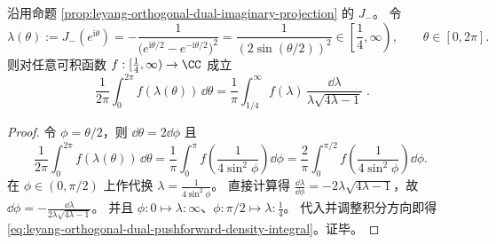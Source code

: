 \begin{theorem}\label{thm:leyang-orthogonal-dual-pushforward-density-formula}
沿用命题 \ref{prop:leyang-orthogonal-dual-imaginary-projection} 的 \(J_{-}\)。
令
\[
\lambda(\theta):=J_{-}(e^{\mathrm{i}\theta})
=-\frac{1}{\bigl(e^{\mathrm{i}\theta/2}-e^{-\mathrm{i}\theta/2}\bigr)^2}
=\frac{1}{(2\sin(\theta/2))^2}\in\left[\frac14,\infty\right),
\qquad \theta\in[0,2\pi].
\]
则对任意可积函数 \(f:[\tfrac14,\infty)\to\CC\) 成立
\begin{equation}\label{eq:leyang-orthogonal-dual-pushforward-density-integral}
\boxed{\;
\frac{1}{2\pi}\int_{0}^{2\pi} f(\lambda(\theta))\,\dd\theta
=
\frac{1}{\pi}\int_{1/4}^{\infty} f(\lambda)\,\frac{\dd\lambda}{\lambda\sqrt{4\lambda-1}}\; }.
\end{equation}
\end{theorem}
\begin{proof}
令 \(\phi=\theta/2\)，则 \(\dd\theta=2\dd\phi\) 且
\[
\frac{1}{2\pi}\int_{0}^{2\pi} f(\lambda(\theta))\,\dd\theta
=\frac{1}{\pi}\int_{0}^{\pi} f\!\left(\frac{1}{4\sin^2\phi}\right)\dd\phi
=\frac{2}{\pi}\int_{0}^{\pi/2} f\!\left(\frac{1}{4\sin^2\phi}\right)\dd\phi.
\]
在 \(\phi\in(0,\pi/2)\) 上作代换 \(\lambda=\frac{1}{4\sin^2\phi}\)。
直接计算得
\(
\frac{\dd\lambda}{\dd\phi}=-2\lambda\sqrt{4\lambda-1}
\)，故
\(
\dd\phi=-\frac{\dd\lambda}{2\lambda\sqrt{4\lambda-1}}
\)。
并且 \(\phi:0\mapsto \lambda:\infty\)、\(\phi:\pi/2\mapsto \lambda:\tfrac14\)。
代入并调整积分方向即得 \eqref{eq:leyang-orthogonal-dual-pushforward-density-integral}。证毕。
\end{proof}

